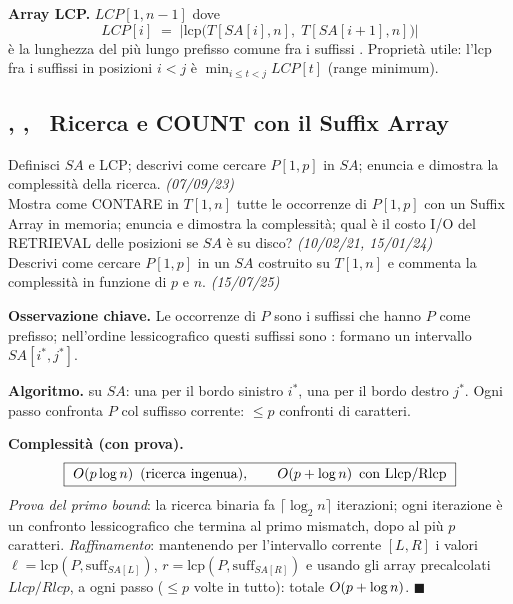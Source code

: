 \textbf{Array LCP.} $\mathit{LCP}[1,n-1]$ dove
\[
\mathit{LCP}[i]\;=\;\bigl|\mathrm{lcp}\bigl(T[\mathit{SA}[i],n],\;T[\mathit{SA}[i+1],n]\bigr)\bigr|
\]
\`e la lunghezza del pi\`u lungo prefisso comune fra i suffissi . Propriet\`a utile: l'lcp fra i suffissi in posizioni $i<j$ \`e
$\min_{i\le t<j}\mathit{LCP}[t]$ (range minimum).

\subsection*{, , \hot\ Ricerca e COUNT con il Suffix Array}

\begin{domanda}
 Definisci $SA$ e LCP; descrivi come cercare $P[1,p]$ in $SA$; enuncia e dimostra la
complessit\`a della ricerca. \emph{(07/09/23)}\\
 Mostra come CONTARE in $T[1,n]$ tutte le occorrenze di $P[1,p]$ con un Suffix Array in
memoria; enuncia e dimostra la complessit\`a; qual \`e il costo I/O del RETRIEVAL delle posizioni
se $SA$ \`e su disco? \emph{(10/02/21, 15/01/24)}\\
 Descrivi come cercare $P[1,p]$ in un $SA$ costruito su $T[1,n]$ e commenta la
complessit\`a in funzione di $p$ e $n$. \emph{(15/07/25)}
\end{domanda}

\textbf{Osservazione chiave.} Le occorrenze di $P$ sono i suffissi che hanno $P$ come prefisso;
nell'ordine lessicografico questi suffissi sono : formano un intervallo
$\mathit{SA}[i^{*},j^{*}]$.

\textbf{Algoritmo.}  su $\mathit{SA}$: una per il bordo sinistro $i^{*}$,
una per il bordo destro $j^{*}$. Ogni passo confronta $P$ col suffisso corrente: $\le p$ confronti
di caratteri.

\textbf{Complessit\`a (con prova).}
\[
\boxed{\ O\!\left(p\log n\right)\ \text{(ricerca ingenua)},\qquad O\!\left(p+\log n\right)\ \text{con Llcp/Rlcp}\ }
\]
\emph{Prova del primo bound}: la ricerca binaria fa $\lceil\log_2 n\rceil$ iterazioni; ogni
iterazione \`e un confronto lessicografico che termina al primo mismatch, dopo al pi\`u $p$
caratteri. \emph{Raffinamento}: mantenendo per l'intervallo corrente $[L,R]$ i valori
$\ell=\mathrm{lcp}(P,\text{suff}_{SA[L]})$, $r=\mathrm{lcp}(P,\text{suff}_{SA[R]})$ e usando gli
array precalcolati $\mathit{Llcp}/\mathit{Rlcp}$, a ogni passo  ($\le p$ volte in
tutto): totale $O\!\left(p+\log n\right)$. $\blacksquare$

